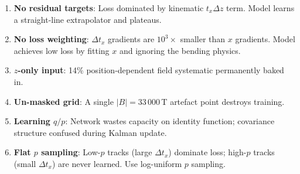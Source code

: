 \documentclass[11pt,a4paper]{article}
\begin{document}
\begin{enumerate}[leftmargin=*]
  \item \textbf{No residual targets}: Loss dominated by kinematic $t_x
        \Delta z$ term. Model learns a straight-line extrapolator and
        plateaus.
  \item \textbf{No loss weighting}: $\Delta t_x$ gradients are
        $10^3 \times$ smaller than $x$ gradients. Model achieves low loss
        by fitting $x$ and ignoring the bending physics.
  \item \textbf{$z$-only input}: 14\% position-dependent field systematic
        permanently baked in.
  \item \textbf{Un-masked grid}: A single $|B| = 33\,000$\,T artefact
        point destroys training.
  \item \textbf{Learning $q/p$}: Network wastes capacity on identity
        function; covariance structure confused during Kalman update.
  \item \textbf{Flat $p$ sampling}: Low-$p$ tracks (large $\Delta t_x$)
        dominate loss; high-$p$ tracks (small $\Delta t_x$) are never learned.
        Use log-uniform $p$ sampling.
\end{enumerate}
\end{document}
